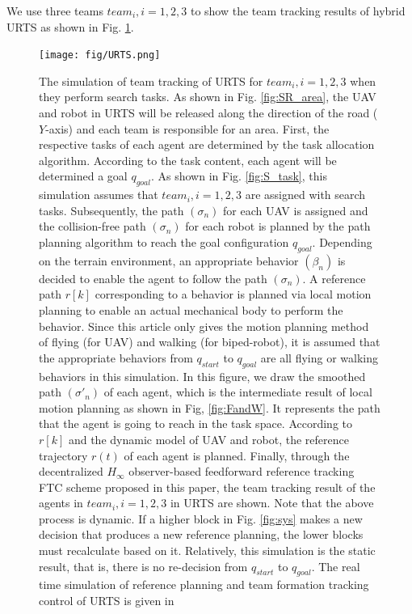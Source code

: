 \documentclass{ieeeaccess}
\begin{document}
We use three teams $team_i, i=1, 2, 3$ to show the team tracking results of hybrid URTS as shown in Fig. \ref{fig:URTS}.
\begin{figure}[htbp]
    \centering
    \texttt{[image: fig/URTS.png]}\caption{The simulation of team tracking of URTS for $team_i,i=1,2,3$ when they perform search tasks. As shown in Fig. \ref{fig:SR_area}, the UAV and robot in URTS will be released along the direction of the road ($Y$-axis) and each team is responsible for an area. First, the respective tasks of each agent are determined by the task allocation algorithm. According to the task content, each agent will be determined a goal $q_{goal}$. As shown in Fig. \ref{fig:S_task}, this simulation assumes that $team_i,i=1,2,3$ are assigned with search tasks. Subsequently, the path $(\sigma_n)$ for each UAV is assigned and the collision-free path $(\sigma_n)$ for each robot is planned by the path planning algorithm to reach the goal configuration $q_{goal}$. Depending on the terrain environment, an appropriate behavior $(\beta_n)$ is decided to enable the agent to follow the path $(\sigma_n)$. A reference path $r[k]$ corresponding to a behavior is planned via local motion planning to enable an actual mechanical body to perform the behavior. Since this article only gives the motion planning method of flying (for UAV) and walking (for biped-robot), it is assumed that the appropriate behaviors from $q_{start}$ to $q_{goal}$ are all flying or walking behaviors in this simulation. In this figure, we draw the smoothed path $(\sigma'_n)$ of each agent, which is the intermediate result of local motion planning as shown in Fig, \ref{fig:FandW}. It represents the path that the agent is going to reach in the task space. According to $r[k]$ and the dynamic model of UAV and robot, the reference trajectory $r(t)$ of each agent is planned. Finally, through the decentralized $H_\infty$ observer-based feedforward reference tracking FTC scheme proposed in this paper, the team tracking result of the agents in $team_i, i=1,2,3$ in URTS are shown. Note that the above process is dynamic. If a higher block in Fig. \ref{fig:sys} makes a new decision that produces a new reference planning, the lower blocks must recalculate based on it. Relatively, this simulation is the static result, that is, there is no re-decision from $q_{start}$ to $q_{goal}$. The real time simulation of reference planning and team formation tracking control of URTS is given in \cite{mySimulation}}
    \label{fig:URTS}
\end{figure}
\end{document}
